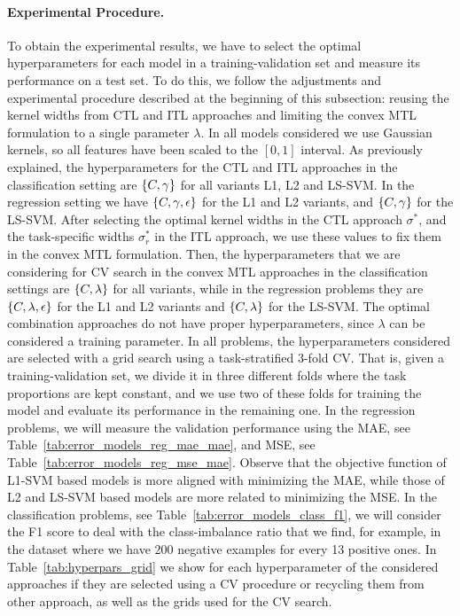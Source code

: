 \paragraph*{Experimental Procedure.}
To obtain the experimental results, we have to select the optimal hyperparameters for each model in a training-validation set and measure its performance on a test set. To do this, we follow the adjustments and experimental procedure described at the beginning of this subsection: reusing the kernel widths from CTL and ITL approaches and limiting the convex MTL formulation to a single parameter $\lambda$.
%
In all models considered we use Gaussian kernels, so all features have been scaled to the $[0, 1]$ interval.
As previously explained, the hyperparameters for the CTL and ITL approaches in the classification setting are $\left\{C, \gamma\right\}$ for all variants L1, L2 and LS-SVM.
In the regression setting we have $\left\{C, \gamma, \epsilon\right\}$ for the L1 and L2 variants, and $\left\{C, \gamma\right\}$ for the LS-SVM.
%
After selecting the optimal kernel widths in the CTL approach $\sigma^*$, and the task-specific widths $\sigma_r^*$ in the ITL approach, we use these values to fix them in the convex MTL formulation.
Then, the hyperparameters that we are considering for CV search in the convex MTL approaches in the classification settings are $\left\{C, \lambda\right\}$ for all variants, while in the regression problems they are $\left\{C, \lambda, \epsilon\right\}$ for the L1 and L2 variants and $\left\{C, \lambda\right\}$ for the LS-SVM.
%
The optimal combination approaches do not have proper hyperparameters, since $\lambda$ can be considered a training parameter.
%
In all problems, the hyperparameters considered are selected with a grid search using a task-stratified $3$-fold CV. That is, given a training-validation set, we divide it in three different folds where the task proportions are kept constant, and we use two of these folds for training the model and evaluate its performance in the remaining one.
%
In the regression problems, we will measure the validation performance using the MAE, see Table~\ref{tab:error_models_reg_mae_mae}, and MSE, see Table~\ref{tab:error_models_reg_mse_mae}.  Observe that the objective function of L1-SVM based models is more aligned with minimizing the MAE, while those of L2 and LS-SVM based models are more related to minimizing the MSE.
In the classification problems, see Table~\ref{tab:error_models_class_f1}, we will consider the F1 score to deal with the class-imbalance ratio that we find, for example, in the  dataset where we have 200 negative examples for every 13 positive ones.
%
In Table~\ref{tab:hyperpars_grid} we show for each hyperparameter of the considered approaches if they are selected using a CV procedure or recycling them from other approach, as well as the grids used for the CV search.

